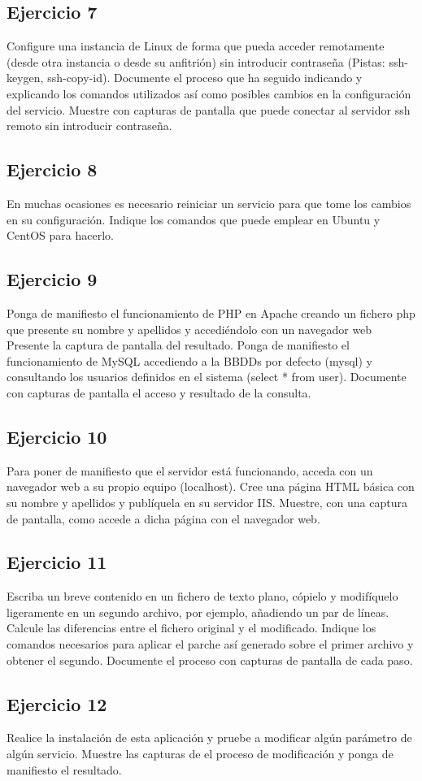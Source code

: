 \documentclass[a4paper, 11pt]{article} %
\begin{document}
\subsection{Ejercicio 7}
Configure una instancia de Linux de forma que pueda acceder
remotamente (desde otra instancia o desde su anfitrión) sin introducir contraseña
(Pistas: ssh-keygen, ssh-copy-id). Documente el proceso que ha seguido indicando y
explicando los comandos utilizados así como posibles cambios en la configuración del
servicio. Muestre con capturas de pantalla que puede conectar al servidor ssh remoto
sin introducir contraseña.


\subsection{Ejercicio 8}
En muchas ocasiones es necesario reiniciar un servicio para que tome los
cambios en su configuración. Indique los comandos que puede emplear en Ubuntu y
CentOS para hacerlo.


\subsection{Ejercicio 9}
Ponga de manifiesto el funcionamiento de PHP en Apache creando un
fichero php que presente su nombre y apellidos y accediéndolo con un navegador web
Presente la captura de pantalla del resultado. Ponga de manifiesto el funcionamiento
de MySQL accediendo a la BBDDs por defecto (mysql) y consultando los usuarios
definidos en el sistema (select * from user). Documente con capturas de pantalla el
acceso y resultado de la consulta.


\subsection{Ejercicio 10}
Para poner de manifiesto que el servidor está funcionando, acceda con
un navegador web a su propio equipo (localhost). Cree una página HTML básica con su
nombre y apellidos y publíquela en su servidor IIS. Muestre, con una captura de
pantalla, como accede a dicha página con el navegador web.


\subsection{Ejercicio 11}
Escriba un breve contenido en un fichero de texto plano, cópielo y
modifíquelo ligeramente en un segundo archivo, por ejemplo, añadiendo un par de
líneas. Calcule las diferencias entre el fichero original y el modificado. Indique los
comandos necesarios para aplicar el parche así generado sobre el primer archivo y
obtener el segundo. Documente el proceso con capturas de pantalla de cada paso.


\subsection{Ejercicio 12}
Realice la instalación de esta aplicación y pruebe a modificar algún
parámetro de algún servicio. Muestre las capturas de el proceso de modificación y
ponga de manifiesto el resultado.
\end{document}

